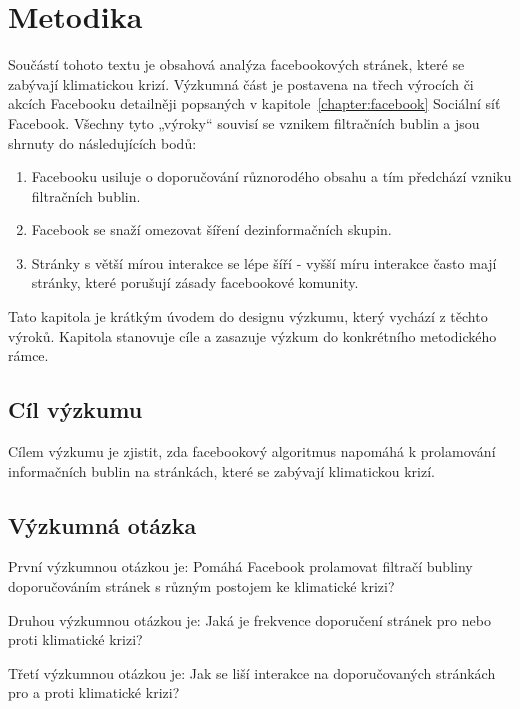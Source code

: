 \chapter{Metodika}
\label{chapter:metodika}
    Součástí tohoto textu je obsahová analýza facebookových stránek, které se zabývají klimatickou krizí. Výzkumná část je postavena na třech výrocích či akcích Facebooku detailněji popsaných v kapitole~\ref{chapter:facebook} Sociální síť Facebook. Všechny tyto „výroky“ souvisí se vznikem filtračních bublin a jsou shrnuty do následujících bodů:
    \begin{enumerate}
        \item Facebooku usiluje o doporučování různorodého obsahu a tím předchází vzniku filtračních bublin. 
        \item Facebook se snaží omezovat šíření dezinformačních skupin.
        \item Stránky s větší mírou interakce se lépe šíří - vyšší míru interakce často mají stránky, které porušují zásady facebookové komunity. 
    \end{enumerate}
    
    Tato kapitola je krátkým úvodem do designu výzkumu, který vychází z těchto výroků. Kapitola stanovuje cíle a zasazuje výzkum do konkrét\-ního metodického rámce. 
 
 
\section{Cíl výzkumu}
\label{sec:cil-vyzkumu}
    Cílem výzkumu je zjistit, zda facebookový algoritmus napomáhá k prolamování informačních bublin na stránkách, které se zabývají klimatickou krizí.


\section{Výzkumná otázka}
\label{sec:vyzkumna-otazka}
    \setlength\parskip{5mm}
    
    První výzkumnou otázkou je: Pomáhá Facebook prolamovat filtračí bubliny doporučováním stránek s různým postojem ke klimatické krizi? 
    
    Druhou výzkumnou otázkou je: Jaká je frekvence doporučení stránek pro nebo proti klimatické krizi? 
    
    Třetí výzkumnou otázkou je: Jak se liší interakce na doporučovaných stránkách pro a proti klimatické krizi? 
    
    \setlength\parskip{0mm}


